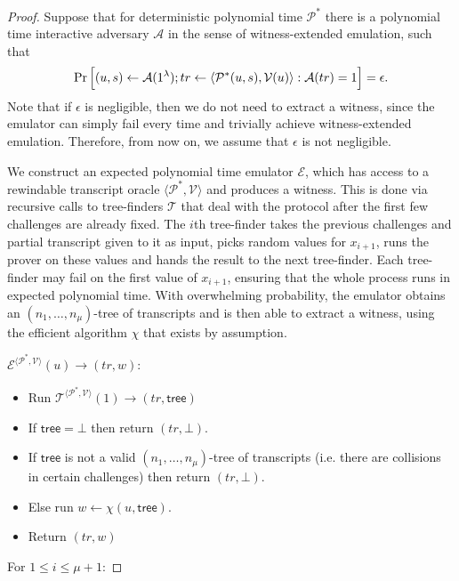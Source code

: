 \begin{proof}\label{forkproof}
Suppose that for deterministic polynomial time $\mathcal{P}^*$ there is a polynomial time interactive adversary $\mathcal{A}$ in the sense of witness-extended emulation, such that
$$ \Pr \Big{[}(u,s) \leftarrow\mathcal{A}(1^{\lambda}); tr \leftarrow \langle \mathcal{P}^*(u,s), \mathcal{V}(u)\rangle: \mathcal{A}(tr)=1\Big{]} = \epsilon.$$
Note that if $\epsilon$ is negligible, then we do not need to extract a witness, since the emulator can simply fail every time and trivially achieve witness-extended emulation. Therefore, from now on, we assume that $\epsilon$ is not negligible.

We construct an expected polynomial time emulator $\mathcal{E}$, which has access to a rewindable transcript oracle $\langle \mathcal{P}^*, \mathcal{V}\rangle$ and produces a witness. This is done via recursive calls to tree-finders $\mathcal{T}$ that deal with the protocol after the first few challenges are already fixed. The $i$th tree-finder takes the previous challenges and partial transcript given to it as input, picks random values for $x_{i+1}$, runs the prover on these values and hands the result to the next tree-finder. Each tree-finder may fail on the first value of $x_{i+1}$, ensuring that the whole process runs in expected polynomial time. With overwhelming probability, the emulator obtains an $(n_1,\ldots,n_\mu)$-tree of transcripts and is then able to extract a witness, using the efficient algorithm $\chi$ that exists by assumption.

\begin{description}
\item $\mathcal{E}^{\langle \mathcal{P}^*, \mathcal{V}\rangle}(u)\to (tr,w)$:
\begin{itemize}
\item Run $\mathcal{T}^{\langle \mathcal{P}^*, \mathcal{V}\rangle}(1) \to (tr,\mathsf{tree})$
\item If $\mathsf{tree}=\bot$ then return $(tr,\bot)$.
\item If $\mathsf{tree}$ is not a valid $(n_1,\ldots,n_\mu)$-tree of transcripts (i.e. there are collisions in certain challenges) then return $(tr,\bot)$.
\item Else run $w \gets \chi(u,\mathsf{tree})$.
\item Return $(tr,w)$
\end{itemize}
\end{description}
For $1 \leq i \leq \mu+1$:


\end{proof}
